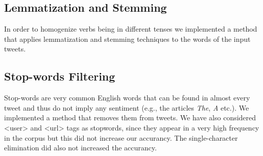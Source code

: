 \subsection{Lemmatization and Stemming}
In order to homogenize verbs being in different tenses we implemented a method that applies lemmatization and stemming techniques to the words of the input tweets.

\subsection{Stop-words Filtering}
Stop-words are very common English words that can be found in almost every tweet and thus do not imply any sentiment (e.g., the articles \textit{The}, \textit{A} etc.).
We implemented a method that removes them from tweets. We have also considered <user> and <url> tags as stopwords, since they appear in a very high frequency in the corpus but this did not increase our accurancy. The single-character elimination did also not increased the accurancy.

